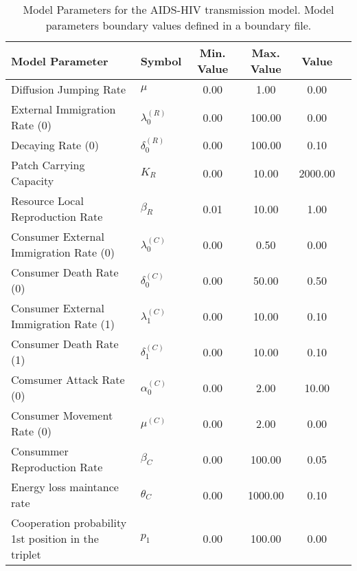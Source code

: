 \begin{table}
\centering
\begin{tabular}{p{5cm}lcccc}
{\bf Model Parameter} & {\bf Symbol} & {\bf Min. Value} & {\bf Max. Value} & {\bf Value}\\
\hline\hline
Diffusion Jumping Rate & $\mu$ & 0.00 & 1.00 & 0.00\\
External Immigration Rate (0) & $\lambda^{(R)}_0$ & 0.00 & 100.00 & 0.00\\
Decaying Rate (0) & $\delta^{(R)}_0$ & 0.00 & 100.00 & 0.10\\
Patch Carrying Capacity & $K_R$ & 0.00 & 10.00 & 2000.00\\
Resource Local Reproduction Rate & $\beta_R$ & 0.01 & 10.00 & 1.00\\
Consumer External Immigration Rate (0) & $\lambda^{(C)}_0$ & 0.00 & 0.50 & 0.00\\
Consumer Death Rate (0) & $\delta^{(C)}_0$ & 0.00 & 50.00 & 0.50\\
Consumer External Immigration Rate (1) & $\lambda^{(C)}_1$ & 0.00 & 10.00 & 0.10\\
Consumer Death Rate (1) & $\delta^{(C)}_1$ & 0.00 & 10.00 & 0.10\\
Comsumer Attack Rate (0) & $\alpha^{(C)}_0$ & 0.00 & 2.00 & 10.00\\
Consumer Movement Rate (0) & $\mu^{(C)}$ & 0.00 & 2.00 & 0.00\\
Consummer Reproduction Rate & $\beta_C$ & 0.00 & 100.00 & 0.05\\
Energy loss maintance rate & $\theta_C$ & 0.00 & 1000.00 & 0.10\\
Cooperation probability 1st position in the triplet & $p_1$ & 0.00 & 100.00 & 0.00\\
\hline\hline
\end{tabular}
\caption{Model Parameters for the AIDS-HIV transmission model. Model parameters boundary values defined in a boundary file.}
\end{table}
